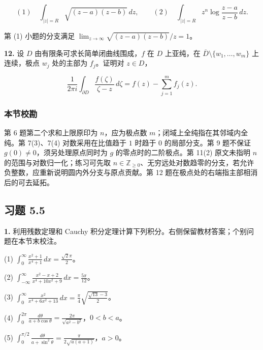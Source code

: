 \documentclass[11pt,a4paper]{article}
\begin{document}
\[
(1)\quad\int_{|z|=R}\sqrt{(z-a)(z-b)}\,dz,\qquad
(2)\quad\int_{|z|=R}z^n\log\frac{z-a}{z-b}\,dz.
\]

第 (1) 小题的分支满足 \(\lim_{z\to\infty}\sqrt{(z-a)(z-b)}/z=1\)。

\par{}
\noindent\textbf{12.} 设 \(D\) 由有限条可求长简单闭曲线围成，\(f\) 在 \(D\)
上亚纯，在 \(\overline D\setminus\{w_1,\ldots,w_m\}\) 上连续，极点
\(w_j\) 处的主部为 \(f_j\)。证明对 \(z\in D\)，

\[
\frac1{2\pi i}\int_{\partial D}\frac{f(\zeta)}{\zeta-z}\,d\zeta
=f(z)-\sum_{j=1}^mf_j(z).
\]

\subsubsection{本节校勘}\label{ch05-practice-ux672cux8282ux6821ux52d8-2}

第 6 题第二个求和上限原印为 \(n\)，应为极点数
\(m\)；闭域上全纯指在其邻域内全纯。第 7(3)、7(4) 对数采用在比值趋于
\(1\) 时趋于 \(0\) 的局部分支。第 9 题不保证
\(g(0)\ne0\)，须另处理原点同时为 \(g\) 的零点时的二阶极点。第 11(2)
原文未指明 \(n\) 的范围与对数归一化；练习可先取
\(n\in\mathbb Z_{\ge0}\)、无穷远处对数趋零的分支，若允许负整数，应重新说明圆内外分支与原点贡献。第
12 题在极点处的右端指主部相消后的可去延拓。

\subsection{习题 5.5}\label{ch05-practice-heading-5}

\par{}
\noindent\textbf{1.} 利用残数定理和 Cauchy
积分定理计算下列积分。右侧保留教材答案；个别问题在本节末校注。

(1)
\(\displaystyle\int_0^\infty\frac{x^2+1}{x^4+1}\,dx=\frac{\sqrt2\pi}{2}\)。

(2)
\(\displaystyle\int_{-\infty}^\infty\frac{x^2-x+2}{x^4+10x^2+9}\,dx=\frac{5\pi}{12}\)。

(3)
\(\displaystyle\int_0^\infty\frac{x^2}{x^4+6x^2+13}\,dx=\frac\pi4\sqrt{\frac{\sqrt{13}-3}{2}}\)。

(4)
\(\displaystyle\int_0^{2\pi}\frac{d\theta}{a+b\cos\theta}=\frac{2\pi}{\sqrt{a^2-b^2}}\)，\(0<b<a\)。

(5)
\(\displaystyle\int_0^{\pi/2}\frac{d\theta}{a+\sin^2\theta}=\frac{\pi}{2\sqrt{a(a+1)}}\)，\(a>0\)。
\end{document}

